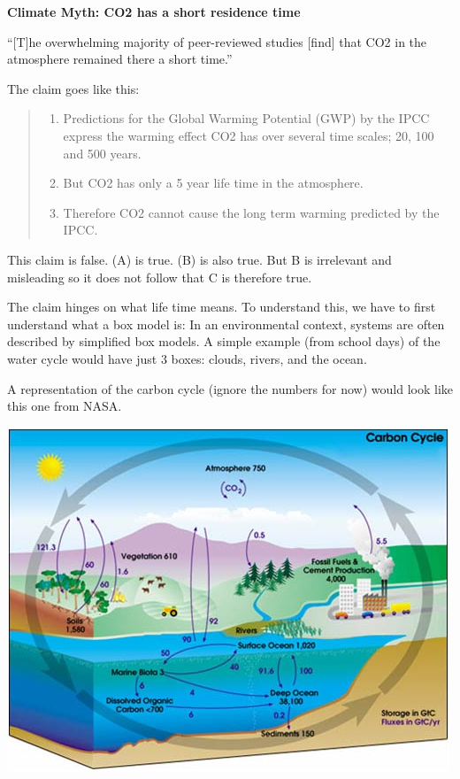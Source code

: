 \documentclass[
]{book}
\providecommand{\tightlist}{%
  \setlength{\itemsep}{0pt}\setlength{\parskip}{0pt}}
\begin{document}
\textbf{Climate Myth: CO2 has a short residence time}

``{[}T{]}he overwhelming majority of peer-reviewed studies {[}find{]} that CO2 in the atmosphere remained there a short time.''

The claim goes like this:

\begin{quote}
\begin{enumerate}
\def\labelenumi{(\Alph{enumi})}
\tightlist
\item
  Predictions for the Global Warming Potential (GWP) by the IPCC express the warming effect CO2 has over several time scales; 20, 100 and 500 years.\\
\item
  But CO2 has only a 5 year life time in the atmosphere.\\
\item
  Therefore CO2 cannot cause the long term warming predicted by the IPCC.
\end{enumerate}
\end{quote}

This claim is false. (A) is true. (B) is also true. But B is irrelevant and misleading so it does not follow that C is therefore true.

The claim hinges on what life time means. To understand this, we have to first understand what a box model is: In an environmental context, systems are often described by simplified box models. A simple example (from school days) of the water cycle would have just 3 boxes: clouds, rivers, and the ocean.

A representation of the carbon cycle (ignore the numbers for now) would look like this one from NASA.

\includegraphics{fig/carbon_cycle_NASA.jpg}
\end{document}
